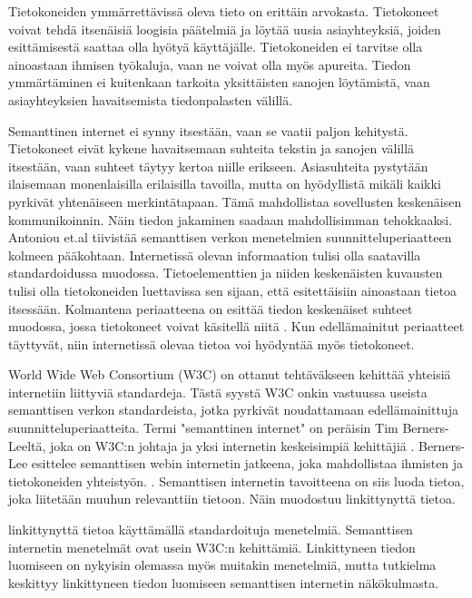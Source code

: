 \documentclass[finnish, 12pt, a4paper, elec, utf8, pdfa, online]{aaltothesis}
\begin{document}
Tietokoneiden ymmärrettävissä oleva tieto on erittäin arvokasta. Tietokoneet voivat tehdä itsenäisiä loogisia päätelmiä ja löytää uusia asiayhteyksiä, joiden esittämisestä saattaa olla hyötyä käyttäjälle. Tietokoneiden ei tarvitse olla ainoastaan ihmisen työkaluja, vaan ne voivat olla myös apureita. Tiedon ymmärtäminen ei kuitenkaan tarkoita yksittäisten sanojen löytämistä, vaan asiayhteyksien havaitsemista tiedonpalasten välillä.


Semanttinen internet ei synny itsestään, vaan se vaatii paljon kehitystä. Tietokoneet eivät kykene havaitsemaan suhteita tekstin ja sanojen välillä itsestään, vaan suhteet täytyy kertoa niille erikseen. Asiasuhteita pystytään ilaisemaan monenlaisilla erilaisilla tavoilla, mutta on hyödyllistä mikäli kaikki pyrkivät yhtenäiseen merkintätapaan. Tämä mahdollistaa sovellusten keskenäisen kommunikoinnin. Näin tiedon jakaminen saadaan mahdollisimman tehokkaaksi. Antoniou et.al tiivistää semanttisen verkon menetelmien suunnitteluperiaatteen kolmeen pääkohtaan. Internetissä olevan informaation tulisi olla saatavilla standardoidussa muodossa. Tietoelementtien ja niiden keskenäisten kuvausten tulisi olla tietokoneiden luettavissa sen sijaan, että esitettäisiin ainoastaan tietoa itsessään. Kolmantena periaatteena on esittää tiedon keskenäiset suhteet muodossa, jossa tietokoneet voivat käsitellä niitä \cite{Antoniou}. Kun edellämainitut periaatteet täyttyvät, niin internetissä olevaa tietoa voi hyödyntää myös tietokoneet.

World Wide Web Consortium (W3C) on ottanut tehtäväkseen kehittää yhteisiä internetiin liittyviä standardeja. Tästä syystä W3C onkin vastuussa useista semanttisen verkon standardeista, jotka pyrkivät noudattamaan edellämainittuja suunnitteluperiaatteita. Termi "semanttinen internet" on peräisin Tim Berners-Leeltä, joka on W3C:n johtaja ja yksi internetin keskeisimpiä kehittäjiä \cite{W3C}. Berners-Lee esittelee semanttisen webin internetin jatkeena, joka mahdollistaa ihmisten ja tietokoneiden yhteistyön. \cite{Berners_visio}. Semanttisen internetin tavoitteena on siis luoda tietoa, joka liitetään muuhun relevanttiin tietoon. Näin muodostuu linkittynyttä tietoa.

linkittynyttä tietoa käyttämällä standardoituja menetelmiä. Semanttisen internetin menetelmät ovat usein W3C:n kehittämiä. Linkittyneen tiedon luomiseen on nykyisin olemassa myös muitakin menetelmiä, mutta tutkielma keskittyy linkittyneen tiedon luomiseen semanttisen internetin näkökulmasta.


\clearpage
\end{document}
